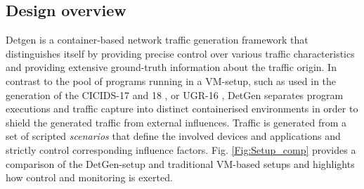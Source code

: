 \documentclass[runningheads]{llncs}
\begin{document}
\subsection{Design overview}

Detgen is a container-based network traffic generation framework that distinguishes itself by providing precise control over various traffic characteristics and providing extensive ground-truth information about the traffic origin. %
In contrast to the pool of programs running in a VM-setup, such as used in the generation of the CICIDS-17 and 18 \cite{sharafaldin2018toward}, or UGR-16 \cite{macia2018ugr}, DetGen separates program executions and traffic capture into distinct containerised environments in order to shield the generated traffic from external influences.%
Traffic is generated from a set of scripted \textit{scenarios} that define the involved devices and applications and strictly control corresponding influence factors. 
Fig. \ref{Fig:Setup_comp} provides a comparison of the DetGen-setup and traditional VM-based setups and highlights how control and monitoring is exerted.
\end{document}

